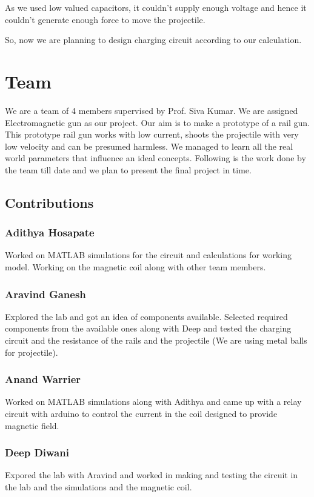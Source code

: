 \documentclass[twoside,twocolumn]{article}
\begin{document}
As we used low valued capacitors, it couldn't supply enough voltage and hence it couldn't generate enough force to move the projectile.

So, now we are planning to design charging circuit according to our calculation.

\section{Team}
We are a team of 4 members supervised by Prof. Siva Kumar. We are assigned Electromagnetic gun as our project. Our aim is to make 
a prototype of a rail gun. This prototype rail gun works with low current, shoots the projectile with very low velocity and can be 
presumed harmless. We managed to learn all the real world parameters that influence an ideal concepts. Following is the work done by the 
team till date and we plan to present the final project in time. 
\subsection*{Contributions}
\subsubsection{Adithya Hosapate}
Worked on MATLAB simulations for the circuit and calculations for working model. Working on the magnetic coil along with other team members. 
\subsubsection{Aravind Ganesh}
Explored the lab and got an idea of components available. Selected required components from the available ones along with Deep and tested 
the charging circuit and the resistance of the rails and the projectile (We are using metal balls for projectile).
\subsubsection{Anand Warrier}
Worked on MATLAB simulations along with Adithya and came up with a relay circuit with arduino to control the current in the coil designed 
to provide magnetic field. 
\subsubsection{Deep Diwani}
Expored the lab with Aravind and worked in making and testing the circuit in the lab and the simulations and the magnetic coil. 


\end{document}
